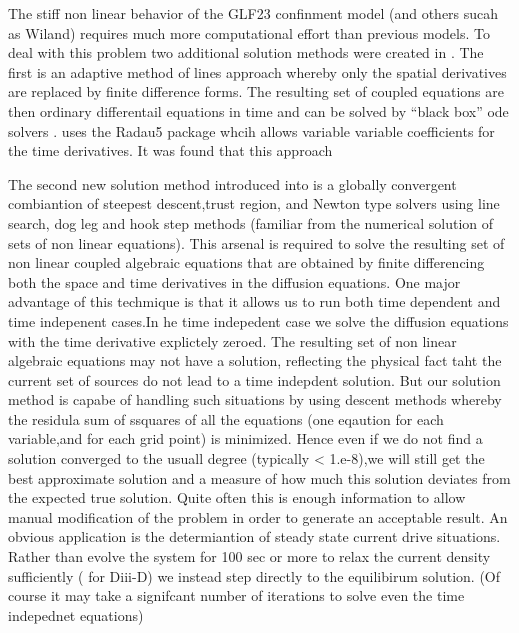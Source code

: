 \documentclass[12pt]{article}
\begin{document}
     The stiff non linear behavior of the GLF23 confinment model
     (and others sucah as Wiland)
     requires much more computational effort than previous models.
     To deal with this problem two additional solution methods were
     created in \ot. The first is an adaptive method of lines approach
     whereby only the spatial derivatives are replaced by finite difference
     forms. The resulting set of coupled equations are then ordinary
     differentail equations in time and can be solved by ``black box''
     ode solvers . \ot uses the Radau5 package whcih allows variable
     variable coefficients for the time derivatives. It was found that
     this approach 

     The second new solution method introduced into \ot is
      a globally convergent combiantion of steepest descent,trust
      region, and Newton type solvers using line search, dog leg and
      hook step methods (familiar from the numerical solution of sets of
      non linear equations). This arsenal is required to solve the
      resulting set of non linear coupled algebraic equations that are
      obtained by finite differencing both the space and time
      derivatives in the diffusion equations. One major advantage of
      this techmique is that it allows us to run both time dependent
      and time indepenent cases.In he time indepedent case we solve
      the diffusion equations with the time derivative explictely
      zeroed. The resulting set of non linear algebraic equations
       may not have a solution, reflecting the physical fact taht the
       current set of sources do not lead to a time indepdent
       solution.
       But our solution method is capabe of handling such situations by using
       descent methods whereby the residula sum of ssquares of all
       the equations  (one eqaution for each variable,and for each grid
       point) is minimized. Hence even if we do not find a solution
       converged to the usuall degree (typically < 1.e-8),we will
       still get the best approximate solution and a measure of how
       much this solution deviates from the expected true solution. 
       Quite often this is enough information to allow 
       manual modification of the problem in order to generate an
       acceptable result. An obvious
      application is the determiantion of steady state current drive 
    situations. Rather than evolve the system for 100 sec or more to
    relax  the current density sufficiently ( for Diii-D) we instead
    step directly to the equilibirum solution. (Of course it may take a
    signifcant number of iterations to solve even the time indepednet
    equations)
      
\end{document}
